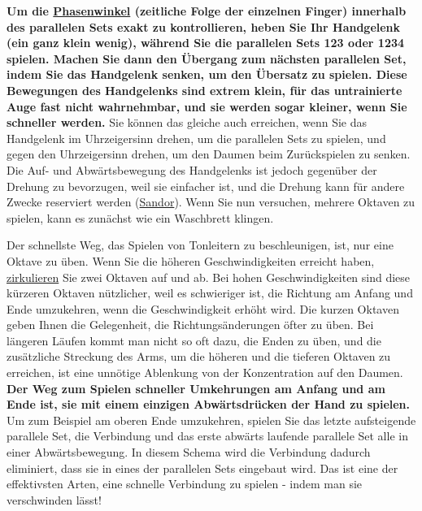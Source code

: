 \textbf{Um die \hyperref[c1iv2a]{Phasenwinkel} (zeitliche Folge der einzelnen Finger) innerhalb des parallelen Sets exakt zu kontrollieren, heben Sie Ihr Handgelenk (ein ganz klein wenig), während Sie die parallelen Sets 123 oder 1234 spielen.
Machen Sie dann den Übergang zum nächsten parallelen Set, indem Sie das Handgelenk senken, um den Übersatz zu spielen.
Diese Bewegungen des Handgelenks sind extrem klein, für das untrainierte Auge fast nicht wahrnehmbar, und sie werden sogar kleiner, wenn Sie schneller werden.}
Sie können das gleiche auch erreichen, wenn Sie das Handgelenk im Uhrzeigersinn drehen, um die parallelen Sets zu spielen, und gegen den Uhrzeigersinn drehen, um den Daumen beim Zurückspielen zu senken.
Die Auf- und Abwärtsbewegung des Handgelenks ist jedoch gegenüber der Drehung zu bevorzugen, weil sie einfacher ist, und die Drehung kann für andere Zwecke reserviert werden (\hyperref[Sandor]{Sandor}).
Wenn Sie nun versuchen, mehrere Oktaven zu spielen, kann es zunächst wie ein Waschbrett klingen.

Der schnellste Weg, das Spielen von Tonleitern zu beschleunigen, ist, nur eine Oktave zu üben.
Wenn Sie die höheren Geschwindigkeiten erreicht haben, \hyperref[c1iii2]{zirkulieren} Sie zwei Oktaven auf und ab.
Bei hohen Geschwindigkeiten sind diese kürzeren Oktaven nützlicher, weil es schwieriger ist, die Richtung am Anfang und Ende umzukehren, wenn die Geschwindigkeit erhöht wird.
Die kurzen Oktaven geben Ihnen die Gelegenheit, die Richtungsänderungen öfter zu üben.
Bei längeren Läufen kommt man nicht so oft dazu, die Enden zu üben, und die zusätzliche Streckung des Arms, um die höheren und die tieferen Oktaven zu erreichen, ist eine unnötige Ablenkung von der Konzentration auf den Daumen.
\textbf{Der Weg zum Spielen schneller Umkehrungen am Anfang und am Ende ist, sie mit einem einzigen Abwärtsdrücken der Hand zu spielen.}
Um zum Beispiel am oberen Ende umzukehren, spielen Sie das letzte aufsteigende parallele Set, die Verbindung und das erste abwärts laufende parallele Set alle in einer Abwärtsbewegung.
In diesem Schema wird die Verbindung dadurch eliminiert, dass sie in eines der parallelen Sets eingebaut wird.
Das ist eine der effektivsten Arten, eine schnelle Verbindung zu spielen - indem man sie verschwinden lässt!

